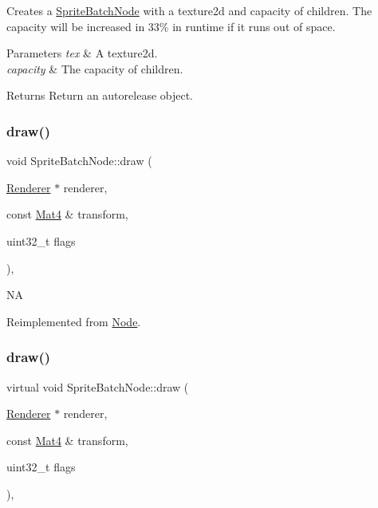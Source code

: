 Creates a \hyperlink{classSpriteBatchNode}{Sprite\+Batch\+Node} with a texture2d and capacity of children. The capacity will be increased in 33\% in runtime if it runs out of space.


\begin{DoxyParams}{Parameters}
{\em tex} & A texture2d. \\
\hline
{\em capacity} & The capacity of children. \\
\hline
\end{DoxyParams}
\begin{DoxyReturn}{Returns}
Return an autorelease object. 
\end{DoxyReturn}
\mbox{\label{classSpriteBatchNode_afa716d3c463c59a6748d68f24045ba9f}} 
\subsubsection{\texorpdfstring{draw()}{draw()}\hspace{0.1cm}{\footnotesize\ttfamily [1/2]}}
{\footnotesize\ttfamily void Sprite\+Batch\+Node\+::draw (\begin{DoxyParamCaption}\item[{\hyperlink{classRenderer}{Renderer} $\ast$}]{renderer,  }\item[{const \hyperlink{classMat4}{Mat4} \&}]{transform,  }\item[{uint32\+\_\+t}]{flags }\end{DoxyParamCaption})\hspace{0.3cm}{\ttfamily [override]}, {\ttfamily [virtual]}}

NA 

Reimplemented from \hyperlink{classNode_abcf85087a15901deb7c6c1231634c8ab}{Node}.

\mbox{\label{classSpriteBatchNode_ad47c7d508825041270ed552f647f86e3}} 
\subsubsection{\texorpdfstring{draw()}{draw()}\hspace{0.1cm}{\footnotesize\ttfamily [2/2]}}
{\footnotesize\ttfamily virtual void Sprite\+Batch\+Node\+::draw (\begin{DoxyParamCaption}\item[{\hyperlink{classRenderer}{Renderer} $\ast$}]{renderer,  }\item[{const \hyperlink{classMat4}{Mat4} \&}]{transform,  }\item[{uint32\+\_\+t}]{flags }\end{DoxyParamCaption})\hspace{0.3cm}{\ttfamily [override]}, {\ttfamily [virtual]}}

